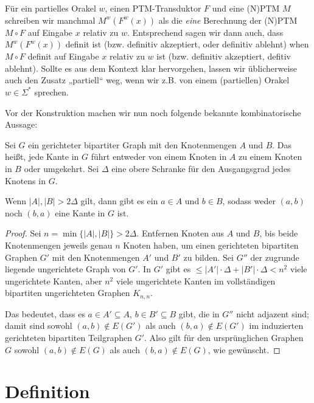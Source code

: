 Für ein partielles Orakel $w$, einen PTM-Transduktor $F$ und eine (N)PTM $M$ schreiben wir manchmal $M^w(F^w(x))$ als die \emph{eine} Berechnung der (N)PTM $M\circ F$ auf Eingabe $x$ relativ zu $w$.
Entsprechend sagen wir dann auch, dass $M^w(F^w(x))$ definit ist (bzw. definitiv akzeptiert, oder definitiv ablehnt) when $M\circ F$ definit auf Eingabe $x$ relativ zu $w$ ist (bzw. definitiv akzeptiert, defitiv ablehnt).
Sollte es aus dem Kontext klar hervorgehen, lassen wir üblicherweise auch den Zusatz „partiell“ weg, wenn wir z.B. von einem (partiellen) Orakel $w\in\Sigma^*$ sprechen.

Vor der Konstruktion machen wir nun noch folgende bekannte kombinatorische Aussage:
\begin{lemma}\label{lemma:bipartite}
    Sei $G$ ein gerichteter bipartiter Graph mit den Knotenmengen $A$ und $B$.
    Das heißt, jede Kante in $G$ führt entweder von einem Knoten in $A$ zu einem Knoten in $B$ oder umgekehrt.
    Sei $\Delta$ eine obere Schranke für den Ausgangsgrad jedes Knotens in $G$.

    Wenn $|A|,|B|>2\Delta$ gilt, dann gibt es ein $a\in A$ und $b\in B$, sodass weder $(a,b)$ noch $(b,a)$ eine Kante in $G$ ist.
\end{lemma}
\begin{proof}
    Sei $n=\min\{|A|,|B|\}>2\Delta$.
    Entfernen Knoten aus $A$ und $B$, bis beide Knotenmengen jeweils genau $n$ Knoten haben, um einen gerichteten bipartiten Graphen $G'$ mit den Knotenmengen $A'$ und $B'$ zu bilden.
    Sei $G''$ der zugrunde liegende ungerichtete Graph von $G'$.
    In $G'$ gibt es $\leq |A'|\cdot \Delta + |B'|\cdot\Delta<n^2$ viele ungerichtete Kanten,
    aber $n^2$ viele ungerichtete Kanten im vollständigen bipartiten ungerichteten Graphen $K_{n,n}$.

    Das bedeutet, dass es $a\in A'\subseteq A$, $b\in B'\subseteq B$ gibt, die in $G''$ nicht adjazent sind; damit sind sowohl $(a,b)\not\in E(G')$ als auch $(b,a)\not\in E(G')$ im induzierten gerichteten bipartiten Teilgraphen $G'$.
    Also gilt für den ursprünglichen Graphen $G$ sowohl $(a,b)\not\in E(G)$ als auch $(b,a)\not\in E(G)$, wie gewünscht.
\end{proof}

\section{Definition}


